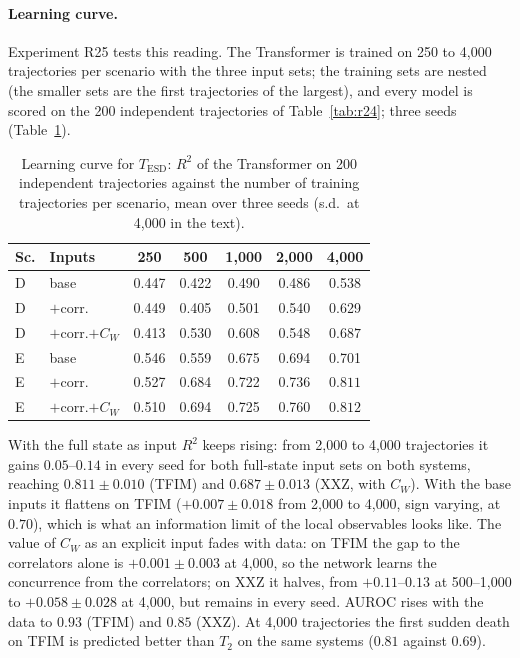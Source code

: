 \documentclass[twocolumn,10pt]{article}
\begin{document}
\paragraph{Learning curve.}
Experiment R25 tests this reading. The Transformer is trained on 250 to
4{,}000 trajectories per scenario with the three input sets; the
training sets are nested (the smaller sets are the first trajectories of
the largest), and every model is scored on the 200 independent
trajectories of Table~\ref{tab:r24}; three seeds (Table~\ref{tab:r25}).

\begin{table}[h]
\centering
\caption{Learning curve for $T_\mathrm{ESD}$: $R^2$ of the Transformer on
  200 independent trajectories against the number of training
  trajectories per scenario, mean over three seeds (s.d.\ at 4{,}000 in
  the text).\label{tab:r25}}
\footnotesize
\setlength{\tabcolsep}{3pt}
\begin{tabular}{llccccc}
\toprule
Sc. & Inputs & 250 & 500 & 1{,}000 & 2{,}000 & 4{,}000 \\
\midrule
D & base & 0.447 & 0.422 & 0.490 & 0.486 & 0.538 \\
D & $+$corr. & 0.449 & 0.405 & 0.501 & 0.540 & 0.629 \\
D & $+$corr.$+C_W$ & 0.413 & 0.530 & 0.608 & 0.548 & $\mathbf{0.687}$ \\
\midrule
E & base & 0.546 & 0.559 & 0.675 & 0.694 & 0.701 \\
E & $+$corr. & 0.527 & 0.684 & 0.722 & 0.736 & $\mathbf{0.811}$ \\
E & $+$corr.$+C_W$ & 0.510 & 0.694 & 0.725 & 0.760 & $\mathbf{0.812}$ \\
\bottomrule
\end{tabular}
\end{table}

With the full state as input $R^2$ keeps rising: from 2{,}000 to
4{,}000 trajectories it gains $0.05$--$0.14$ in every seed for both
full-state input sets on both systems, reaching $0.811 \pm 0.010$ (TFIM)
and $0.687 \pm 0.013$ (XXZ, with $C_W$). With the base inputs it
flattens on TFIM ($+0.007 \pm 0.018$ from 2{,}000 to 4{,}000, sign
varying, at $0.70$), which is what an information limit of the local
observables looks like. The value of $C_W$ as an explicit input fades
with data: on TFIM the gap to the correlators alone is
$+0.001 \pm 0.003$ at 4{,}000, so the network learns the concurrence from
the correlators; on XXZ it halves, from $+0.11$--$0.13$ at 500--1{,}000
to $+0.058 \pm 0.028$ at 4{,}000, but remains in every seed. AUROC rises
with the data to $0.93$ (TFIM) and $0.85$ (XXZ).
At 4{,}000 trajectories the first sudden death on TFIM is predicted
better than $T_2$ on the same systems ($0.81$ against $0.69$).
\end{document}
